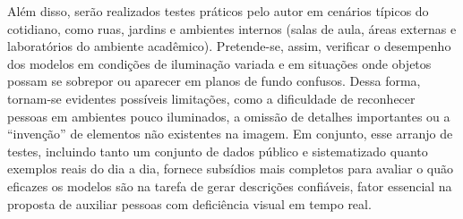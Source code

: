 Além disso, serão realizados testes práticos pelo autor em cenários típicos do cotidiano, como ruas, jardins e ambientes internos (salas de aula, áreas externas e laboratórios do ambiente acadêmico). Pretende-se, assim, verificar o desempenho dos modelos em condições de iluminação variada e em situações onde objetos possam se sobrepor ou aparecer em planos de fundo confusos. Dessa forma, tornam-se evidentes possíveis limitações, como a dificuldade de reconhecer pessoas em ambientes pouco iluminados, a omissão de detalhes importantes ou a “invenção” de elementos não existentes na imagem. Em conjunto, esse arranjo de testes, incluindo tanto um conjunto de dados público e sistematizado quanto exemplos reais do dia a dia, fornece subsídios mais completos para avaliar o quão eficazes os modelos são na tarefa de gerar descrições confiáveis, fator essencial na proposta de auxiliar pessoas com deficiência visual em tempo real.





